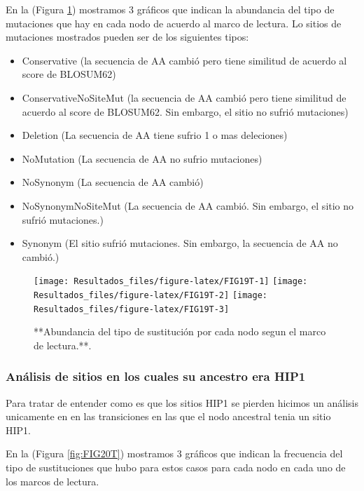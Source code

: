 \documentclass[
]{book}
\providecommand{\tightlist}{%
  \setlength{\itemsep}{0pt}\setlength{\parskip}{0pt}}
\begin{document}
En la (Figura \ref{fig:FIG19T}) mostramos 3 gráficos que indican la abundancia del tipo de mutaciones que hay en cada nodo de acuerdo al marco de lectura. Lo sitios de mutaciones mostrados pueden ser de los siguientes tipos:

\begin{itemize}
\tightlist
\item
  Conservative (la secuencia de AA cambió pero tiene similitud de acuerdo al score de BLOSUM62)
\item
  ConservativeNoSiteMut (la secuencia de AA cambió pero tiene similitud de acuerdo al score de BLOSUM62. Sin embargo, el sitio no sufrió mutaciones)
\item
  Deletion (La secuencia de AA tiene sufrio 1 o mas deleciones)
\item
  NoMutation (La secuencia de AA no sufrio mutaciones)
\item
  NoSynonym (La secuencia de AA cambió)
\item
  NoSynonymNoSiteMut (La secuencia de AA cambió. Sin embargo, el sitio no sufrió mutaciones.)
\item
  Synonym (El sitio sufrió mutaciones. Sin embargo, la secuencia de AA no cambió.)
\end{itemize}

\begin{figure}

{\centering \texttt{[image: Resultados\_files/figure-latex/FIG19T-1]} \texttt{[image: Resultados\_files/figure-latex/FIG19T-2]} \texttt{[image: Resultados\_files/figure-latex/FIG19T-3]} 

}

\caption{**Abundancia del tipo de sustitución por cada nodo segun el marco de lectura.**.}\label{fig:FIG19T}
\end{figure}

\hypertarget{anuxe1lisis-de-sitios-en-los-cuales-su-ancestro-era-hip1-4}{%
\subsubsection{Análisis de sitios en los cuales su ancestro era HIP1}\label{anuxe1lisis-de-sitios-en-los-cuales-su-ancestro-era-hip1-4}}

Para tratar de entender como es que los sitios HIP1 se pierden hicimos un análisis unicamente en en las transiciones en las que el nodo ancestral tenia un sitio HIP1.

En la (Figura \ref{fig:FIG20T}) mostramos 3 gráficos que indican la frecuencia del tipo de sustituciones que hubo para estos casos para cada nodo en cada uno de los marcos de lectura.
\end{document}
